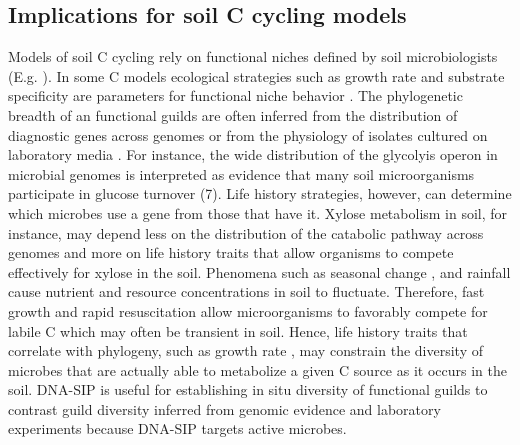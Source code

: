 \subsection{Implications for soil C cycling models}
Models of soil C cycling rely on functional niches defined by soil
microbiologists (E.g. \citep{wieder_2014a,Kaiser2014a}). In some C models
ecological strategies such as growth rate and substrate specificity are
parameters for functional niche behavior \citep{Kaiser2014a}. The phylogenetic
breadth of an functional guilds are often inferred from the distribution of
diagnostic genes across genomes \citep{Berlemont2013} or from the physiology of
isolates cultured on laboratory media \citep{Martiny2013}. For instance, the
wide distribution of the glycolyis operon in microbial genomes is interpreted
as evidence that many soil microorganisms participate in glucose turnover (7).
Life history strategies, however, can determine which microbes use a gene from
those that have it. Xylose metabolism in soil, for instance, may depend less on
the distribution of the catabolic pathway across genomes and more on life
history traits that allow organisms to compete effectively for xylose in the
soil. Phenomena such as seasonal change \citep{Schmidt2007}, and rainfall
\citep{Evans2014a} cause nutrient and resource concentrations in soil to
fluctuate. Therefore, fast growth and rapid resuscitation allow
microorganisms to favorably compete for labile C which may often be transient
in soil. Hence, life history traits that correlate with phylogeny, such as
growth rate \citep{Fierer2007}, may constrain the diversity of microbes that
are actually able to metabolize a given C source as it occurs in the soil.
DNA-SIP is useful for establishing in situ diversity of functional guilds to
contrast guild diversity inferred from genomic evidence and laboratory
experiments because DNA-SIP targets active microbes. 

